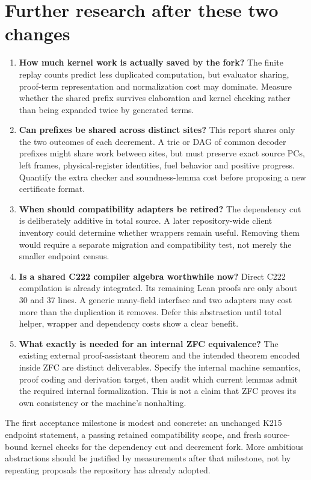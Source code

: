 \section{Further research after these two changes}
\begin{enumerate}
\item \textbf{How much kernel work is actually saved by the fork?} The finite replay counts predict less duplicated computation, but evaluator sharing, proof-term representation and normalization cost may dominate. Measure whether the shared prefix survives elaboration and kernel checking rather than being expanded twice by generated terms.
\item \textbf{Can prefixes be shared across distinct sites?} This report shares only the two outcomes of each decrement. A trie or DAG of common decoder prefixes might share work between sites, but must preserve exact source PCs, left frames, physical-register identities, fuel behavior and positive progress. Quantify the extra checker and soundness-lemma cost before proposing a new certificate format.
\item \textbf{When should compatibility adapters be retired?} The dependency cut is deliberately additive in total source. A later repository-wide client inventory could determine whether wrappers remain useful. Removing them would require a separate migration and compatibility test, not merely the smaller endpoint census.
\item \textbf{Is a shared C222 compiler algebra worthwhile now?} Direct C222 compilation is already integrated. Its remaining Lean proofs are only about 30 and 37 lines. A generic many-field interface and two adapters may cost more than the duplication it removes. Defer this abstraction until total helper, wrapper and dependency costs show a clear benefit.
\item \textbf{What exactly is needed for an internal ZFC equivalence?} The existing external proof-assistant theorem and the intended theorem encoded inside ZFC are distinct deliverables. Specify the internal machine semantics, proof coding and derivation target, then audit which current lemmas admit the required internal formalization. This is not a claim that ZFC proves its own consistency or the machine's nonhalting.
\end{enumerate}

The first acceptance milestone is modest and concrete: an unchanged K215 endpoint statement, a passing retained compatibility scope, and fresh source-bound kernel checks for the dependency cut and decrement fork. More ambitious abstractions should be justified by measurements after that milestone, not by repeating proposals the repository has already adopted.
